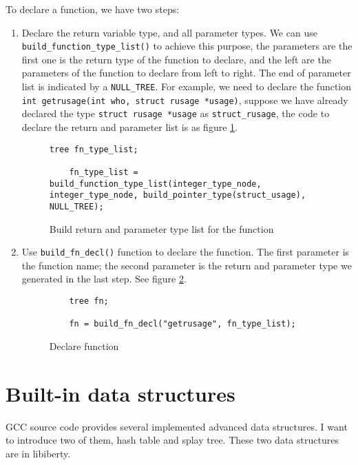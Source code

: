 \documentclass[11pt]{article}
\begin{document}
To declare a function, we have two steps:
\begin{enumerate}
	\item Declare the return variable type, and all parameter types. We can use \texttt{build\_function\_type\_list()} to achieve this purpose, the parameters are the first one is the return type of the function to declare, and the left are the parameters of the function to declare from left to right. The end of parameter list is indicated by a \texttt{NULL\_TREE}.  For example, we need to declare the function \texttt{int getrusage(int who, struct rusage *usage)}, suppose we have already declared the type \texttt{struct rusage *usage} as \texttt{struct\_rusage}, the code to declare the return and parameter list is as figure \ref{fig:Build-fn-list}. 
	
	\begin{figure}
	\begin{lstlisting}[mathescape]
	tree fn_type_list;

	fn_type_list = build_function_type_list(integer_type_node, integer_type_node, build_pointer_type(struct_usage), NULL_TREE);
	\end{lstlisting}
	\caption{Build return and parameter type list for the function}
	\label{fig:Build-fn-list}
	\end{figure}
	
	\item Use \texttt{build\_fn\_decl()} function to declare the function. The first parameter is the function name; the second parameter is the return and parameter type we generated in the last step. See figure \ref{fig:Build-fn-decl}.
	
	\begin{figure}
	\begin{lstlisting}
	tree fn;
	
	fn = build_fn_decl("getrusage", fn_type_list);
	\end{lstlisting}
	\caption{Declare function}
	\label{fig:Build-fn-decl}
	\end{figure}
\end{enumerate} 

\pagebreak

\section{Built-in data structures}
GCC source code provides several implemented advanced data structures. I want to introduce two of
them, hash table and splay tree. These two data structures are in libiberty.
\end{document}
